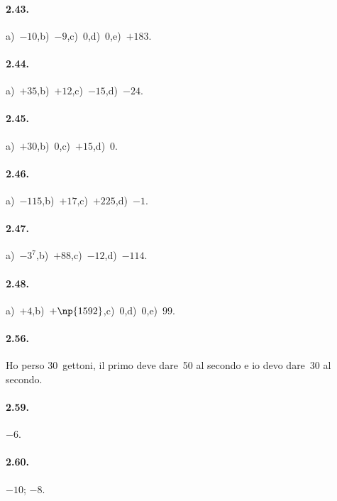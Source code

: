 \paragraph{2.43.}
a)~$-10$,\quad b)~$-9$,\quad c)~$0$,\quad d)~$0$,\quad e)~$+183$.

\paragraph{2.44.}
a)~$+35$,\quad b)~$+12$,\quad c)~$-15$,\quad d)~$-24$.

\paragraph{2.45.}
a)~$+30$,\quad b)~$0$,\quad c)~$+15$,\quad d)~$0$.

\paragraph{2.46.}
a)~$-115$,\quad b)~$+17$,\quad c)~$+225$,\quad d)~$-1$.

\paragraph{2.47.}
a)~$-3^7$,\quad b)~$+88$,\quad c)~$-12$,\quad d)~$-114$.

\paragraph{2.48.}
a)~$+4$,\quad b)~$+\np{1592}$,\quad c)~$0$,\quad d)~$0$,\quad e)~$99$.

\paragraph{2.56.}
Ho perso 30~gettoni, il primo deve dare~50 al secondo e io devo dare~30 al secondo.

\paragraph{2.59.}
$-6$\textdegree.

\paragraph{2.60.}
$-10$; $-8$.
